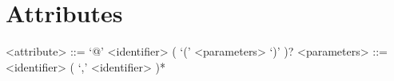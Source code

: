 \section{Attributes}

\begin{grammar}

<attribute> ::= `@' <identifier> ( `(' <parameters> `)' )?
\alt <parameters> ::= <identifier> ( `,' <identifier> )*

\end{grammar}
